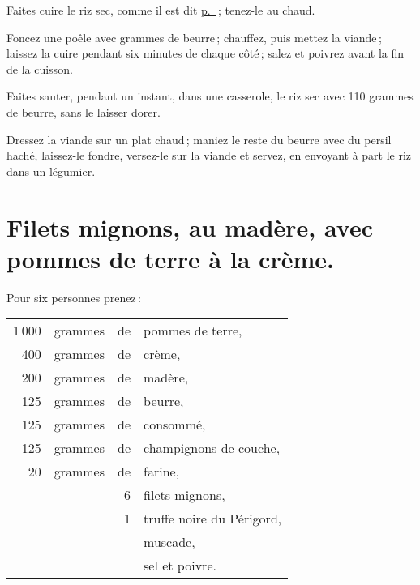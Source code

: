 Faites cuire le riz sec, comme il est dit \hyperlink{p0707}{p. \pageref{pg0707}} ;
tenez-le au chaud.

Foncez une poêle avec {\mmm} grammes de beurre ; chauffez, puis mettez la viande ;
laissez la cuire pendant six minutes de chaque côté ; salez et poivrez avant la
fin de la cuisson.

Faites sauter, pendant un instant, dans une casserole, le riz sec avec 110
grammes de beurre, sans le laisser dorer.

Dressez la viande sur un plat chaud ; maniez le reste du beurre avec du persil
haché, laissez-le fondre, versez-le sur la viande et servez, en envoyant à part
le riz dans un légumier.

\section*{\centering Filets mignons, au madère, avec pommes de terre à la crème.}
{}

Pour six personnes prenez :

\medskip

\footnotesize
\begin{longtable}{rrrp{16em}}
  1 000 & grammes & de & pommes de terre,                                                                 \\
    400 & grammes & de & crème,                                                                           \\
    200 & grammes & de & madère,                                                                          \\
    125 & grammes & de & beurre,                                                                          \\
    125 & grammes & de & consommé,                                                                        \\
    125 & grammes & de & champignons de couche,                                                           \\
     20 & grammes & de & farine,                                                                          \\
        &         &  6 & filets mignons,                                                                  \\
        &         &  1 & truffe noire du Périgord,                                                        \\
        &         &    & muscade,                                                                         \\
        &         &    & sel et poivre.                                                                   \\
\end{longtable}
\normalsize

